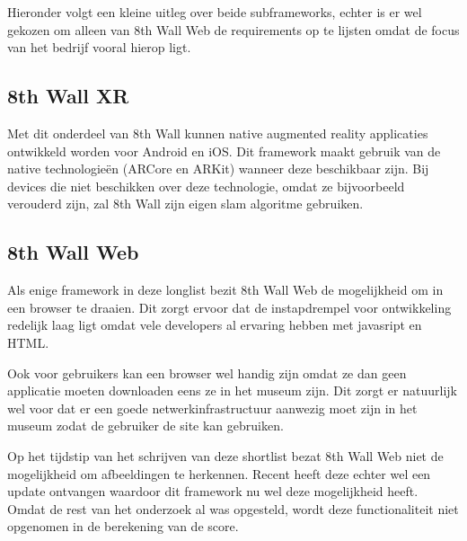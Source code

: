 Hieronder volgt een kleine uitleg over beide subframeworks, echter is er wel gekozen om alleen van 8th Wall Web de requirements op te lijsten omdat de focus van het bedrijf vooral hierop ligt.

\subsection{8th Wall XR}
Met dit onderdeel van 8th Wall kunnen native augmented reality applicaties ontwikkeld worden voor Android en iOS. Dit framework maakt gebruik van de native technologieën (ARCore en ARKit) wanneer deze beschikbaar zijn. Bij devices die niet beschikken over deze technologie, omdat ze bijvoorbeeld verouderd zijn, zal 8th Wall zijn eigen \acrshort{slam} algoritme gebruiken.

\subsection{8th Wall Web}
Als enige framework in deze longlist bezit 8th Wall Web de mogelijkheid om in een browser te draaien. Dit zorgt ervoor dat de instapdrempel voor ontwikkeling redelijk laag ligt omdat vele developers al ervaring hebben met javasript en HTML.

Ook voor gebruikers kan een browser wel handig zijn omdat ze dan geen applicatie moeten downloaden eens ze in het museum zijn. Dit zorgt er natuurlijk wel voor dat er een goede netwerkinfrastructuur aanwezig moet zijn in het museum zodat de gebruiker de site kan gebruiken.

Op het tijdstip van het schrijven van deze shortlist bezat 8th Wall Web niet de mogelijkheid om afbeeldingen te herkennen. Recent heeft deze echter wel een update ontvangen waardoor dit framework nu wel deze mogelijkheid heeft. Omdat de rest van het onderzoek al was opgesteld, wordt deze functionaliteit niet opgenomen in de berekening van de score.


